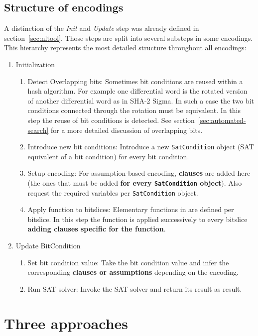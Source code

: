 \subsection{Structure of encodings}
\label{sec:encoding-structure}
%
A distinction of the \emph{Init} and \emph{Update} step was already defined in section~\ref{sec:nltool}. Those steps are split into several substeps in some encodings. This hierarchy represents the most detailed structure throughout all encodings:
\begin{enumerate}
  \item Initialization
    \begin{enumerate}
      \item Detect Overlapping bits: Sometimes bit conditions are reused within a hash algorithm. For example one differential word is the rotated version of another differential word as in SHA-2 Sigma. In such a case the two bit conditions connected through the rotation must be equivalent. In this step the reuse of bit conditions is detected. See section~\ref{sec:automated-search} for a more detailed discussion of overlapping bits.
      \item Introduce new bit conditions: Introduce a new \texttt{SatCondition} object (SAT equivalent of a bit condition) for every bit condition.
      \item Setup encoding: For assumption-based encoding, \textbf{clauses} are added here (the ones that must be added \textbf{for every \texttt{SatCondition} object}). Also request the required variables per \texttt{SatCondition} object.
      \item Apply function to bitslices: Elementary functions in \nltool{} are defined per bitslice. In this step the function is applied successively to every bitslice \textbf{adding clauses specific for the function}.
    \end{enumerate}
  \item Update BitCondition
    \begin{enumerate}
      \item Set bit condition value: Take the bit condition value and infer the corresponding \textbf{clauses or assumptions} depending on the encoding.
      \item Run SAT solver: Invoke the SAT solver and return its result as result.
    \end{enumerate}
\end{enumerate}

\section{Three approaches}
\label{sec:three-approaches}

